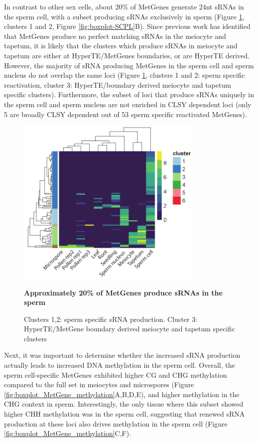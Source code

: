 In contrast to other sex cells, about 20\% of MetGenes generate 24nt sRNAs in the sperm cell, with a subset producing sRNAs exclusively in sperm (Figure \ref{fig:hm_metgene_reactivated}, clusters 1 and 2, Figure \ref{fig:boxplot-SCPL}B). Since previous work has identified that MetGenes produce no perfect matching sRNAs in the meiocyte and tapetum\citep{RN187}, it is likely that the clusters which produce sRNAs in meiocyte and tapetum are either at HyperTE/MetGenes boundaries, or are HyperTE derived. However, the majority of sRNA producing MetGenes in the sperm cell and sperm nucleus do not overlap the same loci (Figure \ref{fig:hm_metgene_reactivated}, clusters 1 and 2: sperm specific reactivation, cluster 3: HyperTE/boundary derived meiocyte and tapetum specific clusters). Furthermore, the subset of loci that produce sRNAs uniquely in the sperm cell and sperm nucleus are not enriched in CLSY dependent loci (only 5 are broadly CLSY dependent out of 53 sperm specific reactivated MetGenes).

\begin{figure}[htbp!] 
\centering
    \includegraphics[width=0.8\textwidth]{Chapter2/Figs/Figure11_Reactivated_MetGenes_heatmap.pdf}
\caption{\textbf{Approximately 20\% of MetGenes produce sRNAs in the sperm}}
\label{fig:hm_metgene_reactivated}
\captionsetup{font=small}
    \caption*{Clusters 1,2: sperm specific sRNA production. Cluster 3: HyperTE/MetGene boundary derived meiocyte and tapetum specific clusters}
\end{figure}

Next, it was important to determine whether the increased sRNA production actually leads to increased DNA methylation in the sperm cell. Overall, the sperm cell-specific MetGenes exhibited higher CG and CHG methylation compared to the full set in meiocytes and microspores (Figure \ref{fig:boxplot_MetGene_methylation}A,B,D,E), and higher methylation in the CHG context in sperm. Interestingly, the only tissue where this subset showed higher CHH methylation was in the sperm cell, suggesting that renewed sRNA production at these loci also drives methylation in the sperm cell (Figure \ref{fig:boxplot_MetGene_methylation}C,F).

